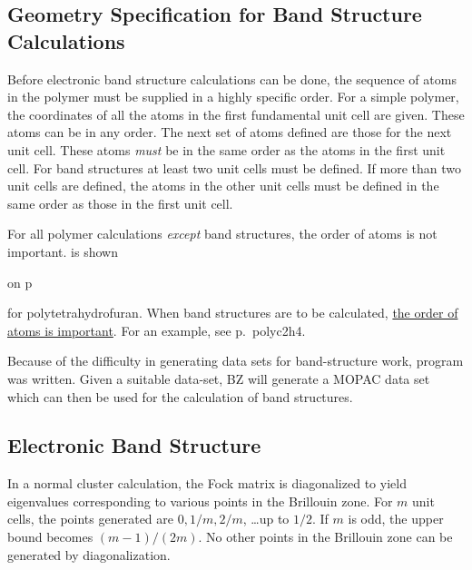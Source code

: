 \subsection{Geometry Specification for Band Structure Calculations}\label{polygeo}
Before electronic band structure calculations can be done, the sequence of
atoms in the polymer must be supplied in a highly specific order.  For a simple
polymer, the coordinates of all the atoms in the first fundamental unit cell
are given.  These atoms can be in any order.  The next set of atoms defined are
those for the next unit cell.  These atoms {\em must} be in the same order as
the atoms in the first unit cell. For band structures at least two unit cells
must be defined.  If more than two unit cells are defined, the atoms in the
other  unit cells must be defined in the same order as those in the first unit
cell.

For all polymer calculations {\em except} band structures, the order of
atoms is not important.  
is shown
\begin{latexonly}
on p~\pageref{pthf}
\end{latexonly} for
polytetrahydrofuran.  When band structures are to be calculated,
\hyperref[pageref]{the order of atoms is important}{. For an example,
see p.~}{}{polyc2h4}.

Because of the difficulty in generating data sets for band-structure work,
program  was written.  Given a suitable data-set, BZ will generate a
MOPAC data set which can then be used for the calculation of band structures.

\subsection{Electronic Band Structure}
In a normal cluster calculation, the Fock matrix is diagonalized to yield
eigenvalues corresponding to various points  in the Brillouin zone.  For
$m$ unit cells, the points generated  are $0, 1/m, 2/m$, \ldots  up to $1/2$.  If
$m$ is odd, the upper bound  becomes $(m-1)/(2m)$.  No other points in the
Brillouin zone can be generated by diagonalization.

